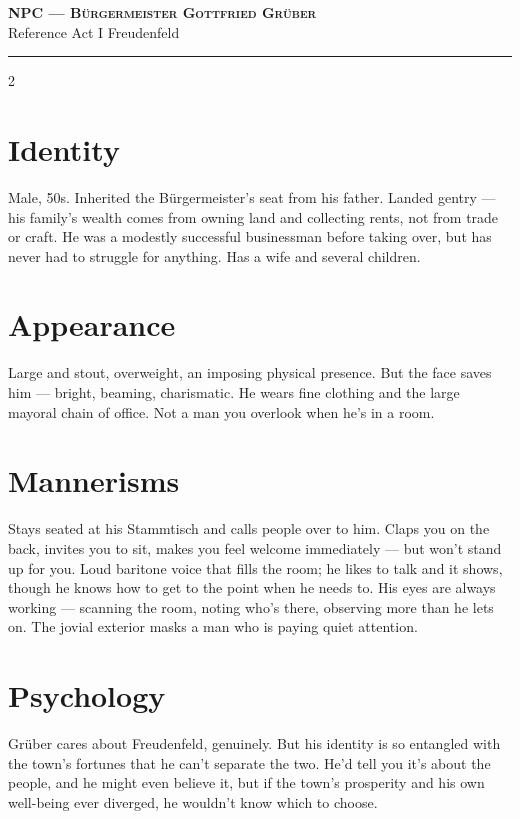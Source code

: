 \documentclass[10pt,letterpaper]{article}
\newcommand{\sceneheader}[4]{%
  \fancyhead[L]{\small\textcolor{accent}{\scshape #1}}%
  \fancyhead[R]{\small\textcolor{accent}{#2 \quad \textbullet \quad #3}}%
  \begin{center}
  {\LARGE\bfseries\scshape\textcolor{accent}{#1}}\\[2pt]
  {\small #2 \quad \textbullet \quad #3 \quad \textbullet \quad #4}\\[2pt]
  \textcolor{rulecol}{\rule{0.5\textwidth}{0.8pt}}
  \end{center}
  \vspace{-4pt}
}
\begin{document}
\newpage


\label{sec:npc-gruber}\sceneheader{NPC --- Bürgermeister Gottfried Grüber}{Reference}{Act I}{Freudenfeld}

\begin{multicols}{2}

\section*{Identity}
Male, 50s. Inherited the Bürgermeister's seat from his father. Landed gentry --- his family's wealth comes from owning land and collecting rents, not from trade or craft. He was a modestly successful businessman before taking over, but has never had to struggle for anything. Has a wife and several children.

\section*{Appearance}
Large and stout, overweight, an imposing physical presence. But the face saves him --- bright, beaming, charismatic. He wears fine clothing and the large mayoral chain of office. Not a man you overlook when he's in a room.

\section*{Mannerisms}
Stays seated at his Stammtisch and calls people over to him. Claps you on the back, invites you to sit, makes you feel welcome immediately --- but won't stand up for you. Loud baritone voice that fills the room; he likes to talk and it shows, though he knows how to get to the point when he needs to. His eyes are always working --- scanning the room, noting who's there, observing more than he lets on. The jovial exterior masks a man who is paying quiet attention.

\section*{Psychology}
Grüber cares about Freudenfeld, genuinely. But his identity is so entangled with the town's fortunes that he can't separate the two. He'd tell you it's about the people, and he might even believe it, but if the town's prosperity and his own well-being ever diverged, he wouldn't know which to choose.


\end{multicols}
\end{document}
